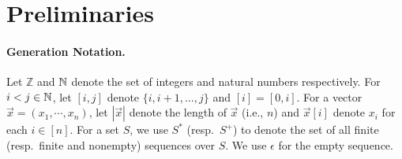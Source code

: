 
\section{Preliminaries}
\label{sec:prelim}

\paragraph{Generation Notation.}
Let $\mathbb{Z}$ and $\mathbb{N}$ denote the set of integers and natural numbers
respectively. For $i < j \in \mathbb{N}$, let $[i,j]$ denote $\{i,i+1,\ldots,j\}$ and
$[i] = [0,i]$. For a vector
$\vec{x}=(x_1,\cdots, x_n)$, let $|\vec{x}|$ denote the length of $\vec{x}$
(i.e., $n$) and  $\vec{x}[i]$ denote $x_i$ for each $i \in [n]$. For a set
$S$, we use $S^*$ (resp.~$S^+$) to denote the set of all finite (resp.~finite
and nonempty) sequences over $S$. We use $\epsilon$ for the empty sequence.

